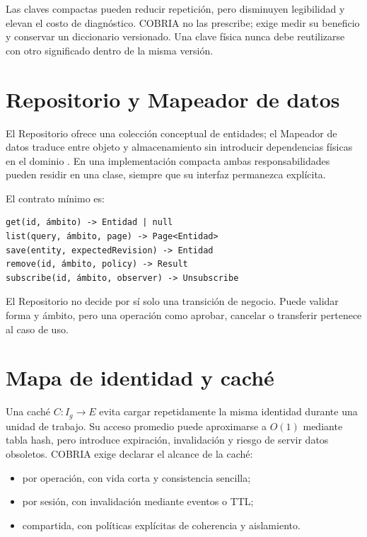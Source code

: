Las claves compactas pueden reducir repetición, pero disminuyen legibilidad y elevan el
costo de diagnóstico. COBRIA no las prescribe; exige medir su beneficio y conservar un
diccionario versionado. Una clave física nunca debe reutilizarse con otro significado
dentro de la misma versión.

\section{Repositorio y Mapeador de datos}

El Repositorio ofrece una colección conceptual de entidades; el Mapeador de datos traduce
entre objeto y almacenamiento sin introducir dependencias físicas en el dominio
\parencite{fowler2002poeaa}. En una implementación compacta ambas responsabilidades
pueden residir en una clase, siempre que su interfaz permanezca explícita.

El contrato mínimo es:

\begin{verbatim}
get(id, ámbito) -> Entidad | null
list(query, ámbito, page) -> Page<Entidad>
save(entity, expectedRevision) -> Entidad
remove(id, ámbito, policy) -> Result
subscribe(id, ámbito, observer) -> Unsubscribe
\end{verbatim}

El Repositorio no decide por sí solo una transición de negocio. Puede validar forma y
ámbito, pero una operación como aprobar, cancelar o transferir pertenece al caso de uso.

\section{Mapa de identidad y caché}

Una caché $C:I_g\rightarrow E$ evita cargar repetidamente la misma identidad durante una
unidad de trabajo. Su acceso promedio puede aproximarse a $O(1)$ mediante tabla hash,
pero introduce expiración, invalidación y riesgo de servir datos obsoletos. COBRIA exige
declarar el alcance de la caché:

\begin{itemize}[leftmargin=*]
  \item por operación, con vida corta y consistencia sencilla;
  \item por sesión, con invalidación mediante eventos o TTL;
  \item compartida, con políticas explícitas de coherencia y aislamiento.
\end{itemize}

